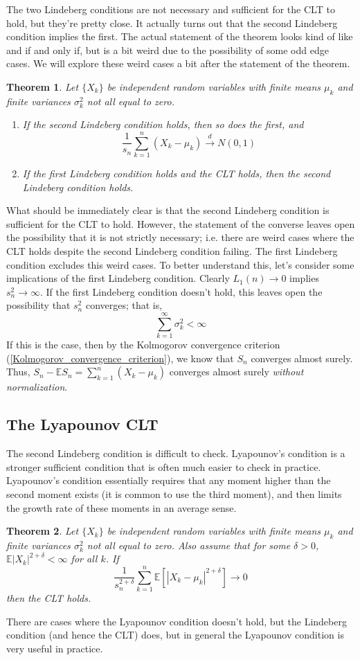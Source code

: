 \documentclass[12pt]{article}
\newcommand*{\abs}[1]{\left\lvert#1\right\rvert}
\newcommand{\E}{\mathbb{E}}
\newtheorem{thm}{Theorem}
\begin{document}
The two Lindeberg conditions are not necessary and sufficient for the CLT to hold, but they're pretty close. It actually turns out that the second Lindeberg condition implies the first. 
The actual statement of the theorem looks kind of like and if and only if, but is a bit weird due to the possibility of some odd edge cases. We will explore these weird cases a bit after
the statement of the theorem. 
\begin{thm}
Let $\{X_k\}$ be independent random variables with finite means $\mu_k$ and finite variances $\sigma_k^2$ not all equal to zero. 
\begin{enumerate}
\item If the second Lindeberg condition holds, then so does the first, and 
\[\frac{1}{s_n} \sum_{k = 1}^{n} (X_k - \mu_k) \overset{d}{\to} N(0, 1)\]
\item If the first Lindeberg condition holds and the CLT holds, then the second Lindeberg condition holds. 
\end{enumerate}
\end{thm}
What should be immediately clear is that the second Lindeberg condition is sufficient for the CLT to hold. However, the statement of the converse leaves open the possibility that 
it is not strictly necessary; i.e. there are weird cases where the CLT holds despite the second Lindeberg condition failing. The first Lindeberg condition excludes this weird cases. To better
understand this, let's consider some implications of the first Lindeberg condition. Clearly $L_1(n) \to 0$ implies $s_n^2 \to \infty$. If the first Lindeberg condition doesn't hold, this leaves open 
the possibility that $s_n^2$ converges; that is, 
\[\sum_{k = 1}^{\infty} \sigma_k^2 < \infty\]
If this is the case, then by the Kolmogorov convergence criterion (\ref{Kolmogorov_convergence_criterion}), we know that $S_n$ converges almost surely. Thus, 
$S_n - \E S_n = \sum_{k = 1}^{n} (X_k - \mu_k)$ converges almost surely \textit{without normalization}. 

\subsection{The Lyapounov CLT}
The second Lindeberg condition is difficult to check. Lyapounov's condition is a stronger sufficient condition that is often much easier to check in practice. Lyapounov's condition essentially 
requires that any moment higher than the second moment exists (it is common to use the third moment), and then limits the growth rate of these moments in an average sense. 
\begin{thm}
Let $\{X_k\}$ be independent random variables with finite means $\mu_k$ and finite variances $\sigma_k^2$ not all equal to zero. Also assume that for some $\delta > 0$, 
$\E \abs{X_k}^{2 + \delta} < \infty$ for all $k$. If 
\[\frac{1}{s_n^{2 + \delta}} \sum_{k = 1}^{n} \E\left[\abs{X_k - \mu_k}^{2 + \delta}\right] \to 0\]
then the CLT holds. 
\end{thm}
There are cases where the Lyapounov condition doesn't hold, but the Lindeberg condition (and hence the CLT) does, but in general the Lyapounov condition is very useful in practice. 
\end{document}
